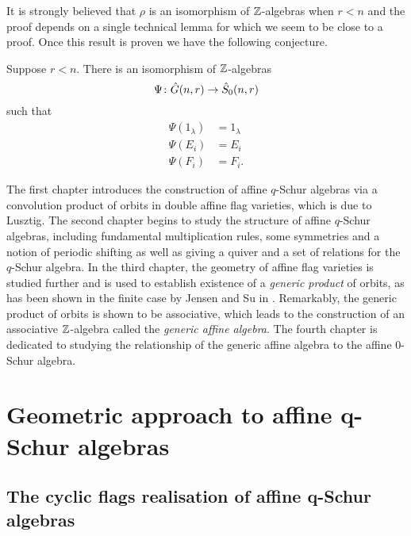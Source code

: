 \documentclass[a4paper, 11pt]{report}
\begin{document}
It is strongly believed that $\rho$ is an isomorphism of $\mathbb{Z}$-algebras when $r<n$ and the proof depends on a single technical lemma for which we seem to be close to a proof. Once this result is proven we have the following conjecture.

\begin{conjecture*}
Suppose $r<n$. There is an isomorphism of $\mathbb{Z}$-algebras
\begin{equation*}
\Psi\colon\hat{G}(n,r)\to\hat{S}_0(n,r)
\end{equation*}
such that
\begin{align*}
\Psi(1_\lambda) &= 1_\lambda\\
\Psi(E_i) &= E_i\\
\Psi(F_i) &= F_i.
\end{align*}
\end{conjecture*}

The first chapter introduces the construction of affine $q$-Schur algebras via a convolution product of orbits in double affine flag varieties, which is due to Lusztig. The second chapter begins to study the structure of affine $q$-Schur algebras, including fundamental multiplication rules, some symmetries and a notion of periodic shifting as well as giving a quiver and a set of relations for the $q$-Schur algebra. In the third chapter, the geometry of affine flag varieties is studied further and is used to establish existence of a \emph{generic product} of orbits, as has been shown in the finite case by Jensen and Su in \cite{su12}. Remarkably, the generic product of orbits is shown to be associative, which leads to the construction of an associative $\mathbb{Z}$-algebra called the \emph{generic affine algebra}. The fourth chapter is dedicated to studying the relationship of the generic affine algebra to the affine $0$-Schur algebra.



\chapter{Geometric approach to affine q-Schur algebras}


\section{The cyclic flags realisation of affine q-Schur algebras}
\renewcommand{\laurent}{\mathcal{S}}
\renewcommand{\polys}{\mathcal{R}}
\end{document}
